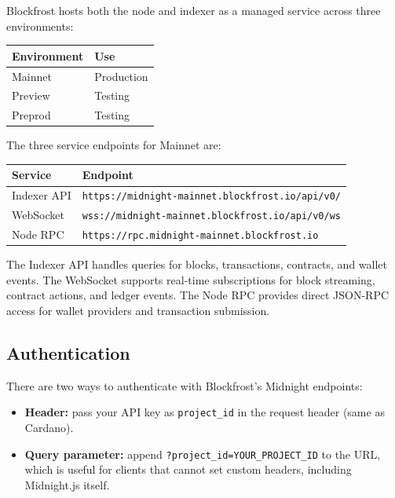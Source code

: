 Blockfrost hosts both the node and indexer as a managed service across three environments:

\begin{center}
\begin{tabular}{ll}
  \hline
  \textbf{Environment} & \textbf{Use} \\
  \hline
  Mainnet  & Production \\
  Preview  & Testing \\
  Preprod  & Testing \\
  \hline
\end{tabular}
\end{center}

The three service endpoints for Mainnet are:

\begin{center}
\begin{tabular}{ll}
  \hline
  \textbf{Service}   & \textbf{Endpoint} \\
  \hline
  Indexer API  & \texttt{https://midnight-mainnet.blockfrost.io/api/v0/} \\
  WebSocket    & \texttt{wss://midnight-mainnet.blockfrost.io/api/v0/ws} \\
  Node RPC     & \texttt{https://rpc.midnight-mainnet.blockfrost.io} \\
  \hline
\end{tabular}
\end{center}

The Indexer API handles queries for blocks, transactions, contracts, and wallet events. The WebSocket supports real-time subscriptions for block streaming, contract actions, and ledger events. The Node RPC provides direct JSON-RPC access for wallet providers and transaction submission.

\subsection*{Authentication}

There are two ways to authenticate with Blockfrost's Midnight endpoints:

\begin{itemize}
  \item \textbf{Header:} pass your API key as \texttt{project\_id} in the request header (same as Cardano).
  \item \textbf{Query parameter:} append \texttt{?project\_id=YOUR\_PROJECT\_ID} to the URL, which is useful for clients that cannot set custom headers, including Midnight.js itself.
\end{itemize}

